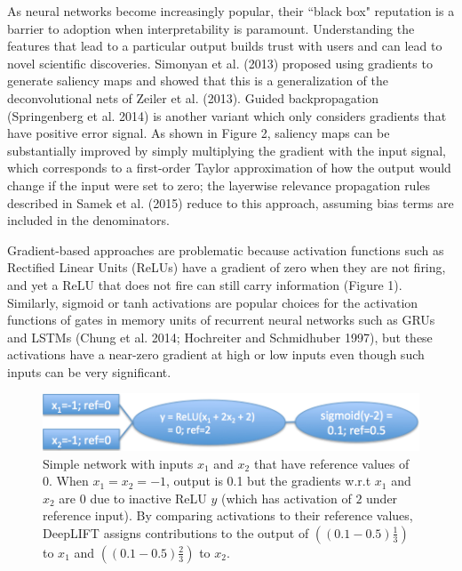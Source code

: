 \documentclass{article}
\begin{document}
As neural networks become increasingly popular, their ``black box" reputation is a barrier to adoption when interpretability is paramount. Understanding the features that lead to a particular output builds trust with users and can lead to novel scientific discoveries. Simonyan et al. (2013) proposed using gradients to generate saliency maps and showed that this is a generalization of the deconvolutional nets of Zeiler et al. (2013). Guided backpropagation (Springenberg et al. 2014) is another variant which only considers gradients that have positive error signal. As shown in Figure 2, saliency maps can be substantially improved by simply multiplying the gradient with the input signal, which corresponds to a first-order Taylor approximation of how the output would change if the input were set to zero; the layerwise relevance propagation rules described in Samek et al. (2015) reduce to this approach, assuming bias terms are included in the denominators.

Gradient-based approaches are problematic because activation functions such as Rectified Linear Units (ReLUs) have a gradient of zero when they are not firing, and yet a ReLU that does not fire can still carry information (Figure 1). Similarly, sigmoid or tanh activations are popular choices for the activation functions of gates in memory units of recurrent neural networks such as GRUs and LSTMs (Chung et al. 2014; Hochreiter and Schmidhuber 1997), but these activations have a near-zero gradient at high or low inputs even though such inputs can be very significant.

\begin{figure}[!ht]
\vspace{-5px}
\begin{center}
\includegraphics[scale=0.5]{SimpleExample.png}
\caption{Simple network with inputs $x_1$ and $x_2$ that have reference values of 0. When $x_1 = x_2 = -1$, output is 0.1 but the gradients w.r.t $x_1$ and $x_2$ are 0 due to inactive ReLU $y$ (which has activation of $2$ under reference input). By comparing activations to their reference values, DeepLIFT assigns contributions to the output of $\left((0.1-0.5)\frac{1}{3}\right)$ to $x_1$ and $\left((0.1-0.5)\frac{2}{3}\right)$ to $x_2$.}
\end{center}
\vspace{-10px}
\end{figure}
\end{document}
